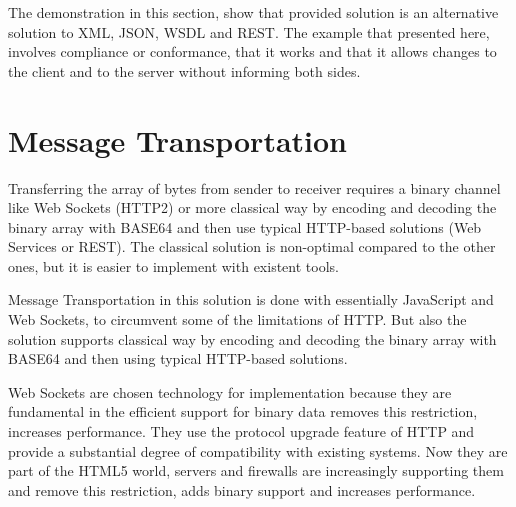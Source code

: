 The demonstration in this section, show that provided solution is an alternative solution to XML, JSON, WSDL and REST. The example that presented here, involves compliance or conformance, that it works and that it allows changes to the client and to the server without informing both sides.



\section{Message Transportation}
\label{section:messageTransfer}

Transferring the array of bytes from sender to receiver requires a binary channel like Web Sockets (HTTP2) or more classical way by encoding and decoding the binary array with BASE64 and then use typical HTTP-based solutions (Web Services or REST). The classical solution is non-optimal compared to the other ones, but it is easier to implement with existent tools.

Message Transportation in this solution is done with essentially JavaScript and Web Sockets, to circumvent some of the limitations of HTTP. But also the solution supports classical way by encoding and decoding the binary array with BASE64 and then using typical HTTP-based solutions.

Web Sockets are chosen technology for implementation because they are fundamental in the efficient support for binary data removes this restriction, increases performance. They use the protocol upgrade feature of HTTP and provide a substantial degree of compatibility with existing systems. Now they are part of the HTML5 world, servers and firewalls are increasingly supporting them and remove this restriction, adds binary support and increases performance.

